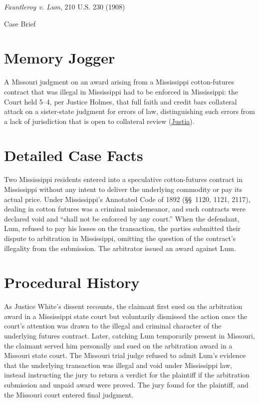 \documentclass[12pt]{article}
\begin{document}
\begin{center}
{\LARGE \textit{Fauntleroy v. Lum}, 210 U.S. 230 (1908)\par}
\vspace{0.8em}
{\large Case Brief\par}
\end{center}
\vspace{1em}

\section{Memory Jogger}
A Missouri judgment on an award arising from a Mississippi cotton-futures contract that was illegal in Mississippi had to be enforced in Mississippi: the Court held 5--4, per Justice Holmes, that full faith and credit bars collateral attack on a sister-state judgment for errors of law, distinguishing such errors from a lack of jurisdiction that is open to collateral review (\href{https://supreme.justia.com/cases/federal/us/210/230/}{Justia}).

\section{Detailed Case Facts}
Two Mississippi residents entered into a speculative cotton-futures contract in Mississippi without any intent to deliver the underlying commodity or pay its actual price. Under Mississippi's Annotated Code of 1892 (\S\S~1120, 1121, 2117), dealing in cotton futures was a criminal misdemeanor, and such contracts were declared void and ``shall not be enforced by any court.'' When the defendant, Lum, refused to pay his losses on the transaction, the parties submitted their dispute to arbitration in Mississippi, omitting the question of the contract's illegality from the submission. The arbitrator issued an award against Lum.

\section{Procedural History}
As Justice White's dissent recounts, the claimant first sued on the arbitration award in a Mississippi state court but voluntarily dismissed the action once the court's attention was drawn to the illegal and criminal character of the underlying futures contract. Later, catching Lum temporarily present in Missouri, the claimant served him personally and sued on the arbitration award in a Missouri state court. The Missouri trial judge refused to admit Lum's evidence that the underlying transaction was illegal and void under Mississippi law, instead instructing the jury to return a verdict for the plaintiff if the arbitration submission and unpaid award were proved. The jury found for the plaintiff, and the Missouri court entered final judgment.
\end{document}
